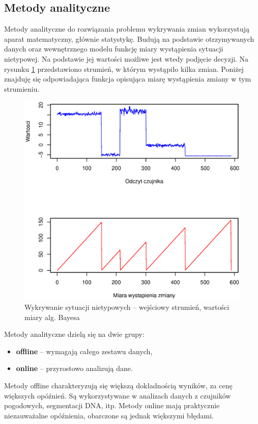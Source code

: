 \newpage
\subsection{Metody analityczne}
Metody analityczne do rozwiązania problemu wykrywania zmian wykorzystują aparat matematyczny,
głównie statystykę.
Budują na podstawie otrzymywanych danych
oraz wewnętrznego modelu funkcję miary wystąpienia sytuacji nietypowej.
Na podstawie jej wartości możliwe jest wtedy podjęcie decyzji.
Na rysunku \ref{fig:SignalAnalytics} przedstawiono strumień,
w którym wystąpiło kilka zmian.
Poniżej znajduję się odpowiadająca funkcja opisująca miarę wystąpienia zmiany w tym strumieniu.
\begin{figure}[htbp]
\centering
	\includegraphics[width=1\textwidth]{img/ch-2-change}
	\caption{Wykrywanie sytuacji nietypowych -- wejściowy strumień, wartości miary alg. Bayesa}
  \label{fig:SignalAnalytics}
\end{figure}

Metody analityczne dzielą się na dwie grupy:
\begin{itemize}
  \item \textbf{offline} -- wymagają całego zestawu danych,
  \item \textbf{online} -- przyrostowo analizują dane.
\end{itemize}
Metody offline charakteryzują się większą dokładnością wyników,
za cenę większych opóźnień.
Są wykorzystywane w analizach danych z czujników pogodowych, segmentacji DNA, itp.
Metody online mają praktycznie niezauważalne opóźnienia,
obarczone są jednak większymi błędami.
